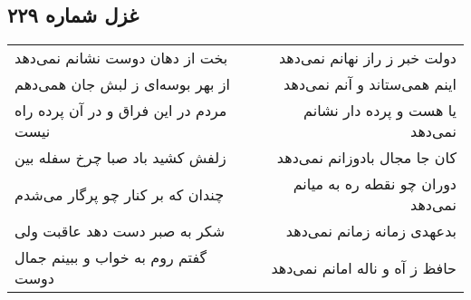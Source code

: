 \begin{center}
\section*{غزل شماره ۲۲۹}
\label{sec:sh229}
\begin{longtable}{l p{0.5cm} r}
بخت از دهان دوست نشانم نمی‌دهد
&&
دولت خبر ز راز نهانم نمی‌دهد
\\
از بهر بوسه‌ای ز لبش جان همی‌دهم
&&
اینم همی‌ستاند و آنم نمی‌دهد
\\
مردم در این فراق و در آن پرده راه نیست
&&
یا هست و پرده دار نشانم نمی‌دهد
\\
زلفش کشید باد صبا چرخ سفله بین
&&
کان جا مجال بادوزانم نمی‌دهد
\\
چندان که بر کنار چو پرگار می‌شدم
&&
دوران چو نقطه ره به میانم نمی‌دهد
\\
شکر به صبر دست دهد عاقبت ولی
&&
بدعهدی زمانه زمانم نمی‌دهد
\\
گفتم روم به خواب و ببینم جمال دوست
&&
حافظ ز آه و ناله امانم نمی‌دهد
\\
\end{longtable}
\end{center}
